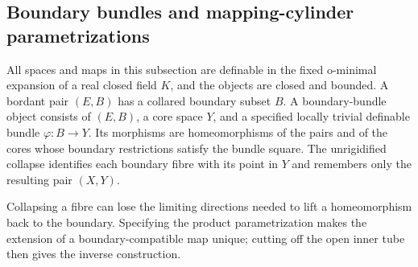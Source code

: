 \subsection{Boundary bundles and mapping-cylinder parametrizations}
\label{subsec:boundary-bundle-rulings}
All spaces and maps in this subsection are definable in the fixed
o-minimal expansion of a real closed field $K$, and the objects are
closed and bounded.  A bordant pair $(E,B)$ has a collared boundary
subset $B$.  A boundary-bundle object consists of $(E,B)$, a core
space $Y$, and a specified locally trivial definable bundle
$\varphi:B\to Y$.  Its morphisms are homeomorphisms of the pairs
and of the cores whose boundary restrictions satisfy the bundle
square.  The unrigidified collapse identifies each boundary fibre
with its point in $Y$ and remembers only the resulting pair $(X,Y)$.

Collapsing a fibre can lose the limiting directions needed to lift a
homeomorphism back to the boundary. Specifying the product
parametrization makes the extension of a boundary-compatible map
unique; cutting off the open inner tube then gives the inverse
construction.

